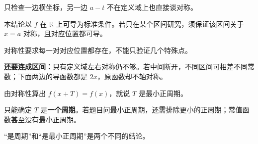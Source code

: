 \begin{trapbox}
  \medskip
  \begin{description}[style=nextline,leftmargin=2.8em,labelsep=0.5em,itemsep=0.25em]
    \item[\textbf{\textcolor{CTrap}{易错点四（不检查定义域）}}] 只检查一边横坐标，另一边 $a-t$ 不在定义域上也直接谈对称。
    \item[\textbf{\textcolor{CTrap}{正确理解：}}] 本结论以 $f$ 在 $\mathbb R$ 上可导为标准条件。若只在某个区间研究，须保证该区间关于 $x=a$ 对称，且对应位置都可导。
    \item[\textbf{\textcolor{CTrap}{错因分析：}}] 对称性要求每一对对应位置都存在，不能只验证几个特殊点。
  \end{description}

\textbf{还要连成区间：}只有定义域左右对称仍不够。若中间断开，不同区间可相差不同常数；下面两边的导函数都是 $2x$，原函数却不轴对称。
\begin{center}

\end{center}


  \medskip
  \begin{description}[style=nextline,leftmargin=2.8em,labelsep=0.5em,itemsep=0.25em]
    \item[\textbf{\textcolor{CTrap}{易错点五（把一个周期认成最小正周期）}}] 由对称性算出 $f(x+T)=f(x)$，就说 $T$ 是最小正周期。
    \item[\textbf{\textcolor{CTrap}{正确理解：}}] 只能确定 $T$ 是\textbf{一个周期}。若题目问最小正周期，还需排除更小的正周期；常值函数甚至没有最小正周期。
    \item[\textbf{\textcolor{CTrap}{错因分析：}}] “是周期”和“是最小正周期”是两个不同的结论。
  \end{description}
\begin{center}

\end{center}

\end{trapbox}
